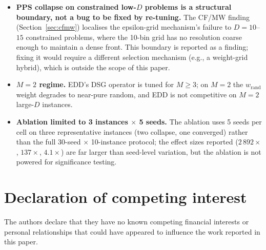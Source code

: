 \documentclass[preprint,12pt]{elsarticle}
\begin{document}
\begin{itemize}
\item \textbf{PPS collapse on constrained low-$D$ problems is a structural
boundary, not a bug to be fixed by re-tuning.} The CF/MW finding
(Section~\ref{sec:cfmw}) localises the epsilon-grid mechanism's failure to
$D = 10$--$15$ constrained problems, where the 10-bin grid has no resolution
coarse enough to maintain a dense front. This boundary is reported as a
finding; fixing it would require a different selection mechanism (e.g., a
weight-grid hybrid), which is outside the scope of this paper.

\item \textbf{$M = 2$ regime.} EDD's DSG operator is tuned for $M \ge 3$; on
$M = 2$ the $w_{\mathrm{rand}}$ weight degrades to near-pure random, and EDD
is not competitive on $M = 2$ large-$D$ instances.

\item \textbf{Ablation limited to 3 instances $\times$ 5 seeds.} The ablation
uses 5 seeds per cell on three representative instances (two collapse, one
converged) rather than the full 30-seed $\times$ 10-instance protocol; the
effect sizes reported ($2\,892\times$, $137\times$, $4.1\times$) are far
larger than seed-level variation, but the ablation is not powered for
significance testing.
\end{itemize}


\section*{Declaration of competing interest}

The authors declare that they have no known competing financial interests or
personal relationships that could have appeared to influence the work
reported in this paper.
\end{document}
